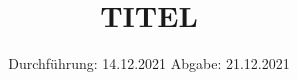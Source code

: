

\subject{V308}
\title{TITEL}
\date{%
  Durchführung: 14.12.2021
  \hspace{3em}
  Abgabe: 21.12.2021
}



\maketitle
\thispagestyle{empty}
\tableofcontents
\newpage






\printbibliography{}


